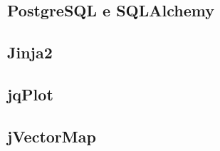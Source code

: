         \subsection{PostgreSQL e SQLAlchemy} \label{subsec:p;sl;postgreSQL_SQLAlchemy}
        
        \subsection{Jinja2} \label{subsec:p;sl;jinja2}
        
        \subsection{jqPlot} \label{subsec:p;sl;jqplot}
        
        \subsection{jVectorMap} \label{subsec:p;sl;jvectormap}
